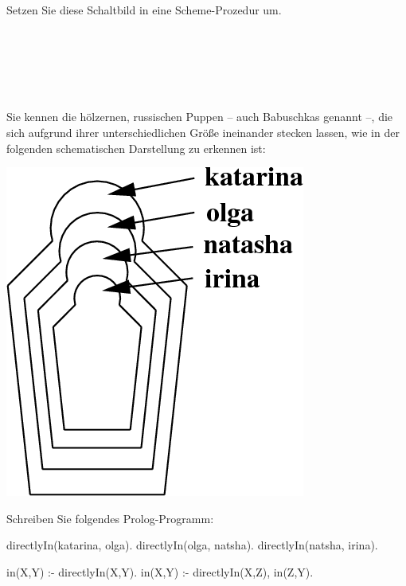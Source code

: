 \documentclass[12pt]{exam}
\begin{document}
\begin{questions}
\begin{parts}
Setzen Sie diese Schaltbild in eine Scheme-Prozedur um.
\end{parts}

\pagebreak 
\ 

\pagebreak
\ 

\pagebreak
\ 

\question 
Sie kennen die hölzernen, russischen Puppen -- auch Babuschkas genannt
--, die sich aufgrund ihrer unterschiedlichen Größe ineinander stecken
lassen, wie in der folgenden schematischen Darstellung zu erkennen
ist:

\includegraphics[scale=0.3]{babuschkas.png}

Schreiben Sie folgendes Prolog-Programm:

\begin{solution}
  directlyIn(katarina, olga).  directlyIn(olga, natsha).
  directlyIn(natsha, irina).

  in(X,Y) :- directlyIn(X,Y).  in(X,Y) :- directlyIn(X,Z), in(Z,Y).
\end{solution}
\pagebreak
\ 
\end{questions}
\end{document}
